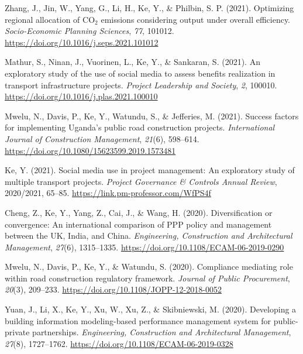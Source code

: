 \documentclass[11pt,a4paper]{report} %
\begin{document}
\begin{tablist}
        \item[2021] \tab{}Zhang, J., Jin, W., Yang, G., Li, H., Ke, Y., \& Philbin, S. P. (2021). Optimizing regional allocation of CO$_2$ emissions considering output under overall efficiency. \textit{Socio-Economic Planning Sciences}, \textit{77}, 101012. \href{https://doi.org/10.1016/j.seps.2021.101012}{https://doi.org/10.1016/j.seps.2021.101012}
        
        \item[2021] \tab{}Mathur, S., Ninan, J., Vuorinen, L., Ke, Y., \& Sankaran, S. (2021). An exploratory study of the use of social media to assess benefits realization in transport infrastructure projects. \textit{Project Leadership and Society}, \textit{2}, 100010. \href{https://doi.org/10.1016/j.plas.2021.100010}{https://doi.org/10.1016/j.plas.2021.100010}
        
        \item[2021] \tab{}Mwelu, N., Davis, P., Ke, Y., Watundu, S., \& Jefferies, M. (2021). Success factors for implementing Uganda's public road construction projects. \textit{International Journal of Construction Management}, \textit{21}(6), 598--614. \href{https://doi.org/10.1080/15623599.2019.1573481}{https://doi.org/10.1080/15623599.2019.1573481}

        \item[2021] \tab{}Ke, Y. (2021). Social media use in project management: An exploratory study of multiple transport projects. \textit{Project Governance \& Controls Annual Review}, 2020/2021, 65--85. \href{https://link.pm-professor.com/WfPS4f}{https://link.pm-professor.com/WfPS4f}
        
        \item[2020] \tab{}Cheng, Z., Ke, Y., Yang, Z., Cai, J., \& Wang, H. (2020). Diversification or convergence: An international comparison of PPP policy and management between the UK, India, and China. \textit{Engineering, Construction and Architectural Management}, \textit{27}(6), 1315--1335. \href{https://doi.org/10.1108/ECAM-06-2019-0290}{https://doi.org/10.1108/ECAM-06-2019-0290}
        
        \item[2020] \tab{}Mwelu, N., Davis, P., Ke, Y., \& Watundu, S. (2020). Compliance mediating role within road construction regulatory framework. \textit{Journal of Public Procurement}, \textit{20}(3), 209--233. \href{https://doi.org/10.1108/JOPP-12-2018-0052}{https://doi.org/10.1108/JOPP-12-2018-0052}
        
        \item[2020] \tab{}Yuan, J., Li, X., Ke, Y., Xu, W., Xu, Z., \& Skibniewski, M. (2020). Developing a building information modeling-based performance management system for public-private partnerships. \textit{Engineering, Construction and Architectural Management}, \textit{27}(8), 1727--1762. \href{https://doi.org/10.1108/ECAM-06-2019-0328}{https://doi.org/10.1108/ECAM-06-2019-0328}
        

\end{tablist}
\end{document}
